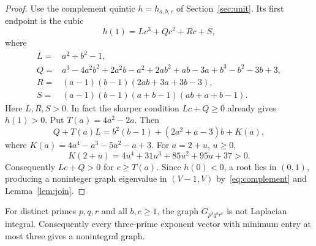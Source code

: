\begin{proof}
Use the complement quintic $h=h_{a,b,c}$ of Section~\ref{sec:unit}.
Its first endpoint is the cubic
\begin{equation}
\label{eq:general-first-endpoint}
h(1)=Lc^3+Qc^2+Rc+S,
\end{equation}
where
\begin{align*}
L={}&a^2+b^2-1,\\
Q={}&a^3-4a^2b^2+2a^2b-a^2+2ab^2+ab-3a
       +b^3-b^2-3b+3,\\
R={}&(a-1)(b-1)(2ab+3a+3b-3),\\
S={}&(a-1)(b-1)(a+b-1)(ab+a+b-1).
\end{align*}
Here $L,R,S>0$. In fact the sharper condition $Lc+Q\geq0$
already gives $h(1)>0$. Put $T(a)=4a^2-2a$. Then
\[
Q+T(a)L=b^2(b-1)+(2a^2+a-3)b+K(a),
\]
where $K(a)=4a^4-a^3-5a^2-a+3$. For $a=2+u$, $u\geq0$,
\[
K(2+u)=4u^4+31u^3+85u^2+95u+37>0.
\]
Consequently $Lc+Q>0$ for $c\geq T(a)$. Since $h(0)<0$,
a root lies in $(0,1)$, producing a noninteger graph eigenvalue in
$(V-1,V)$ by~\eqref{eq:complement} and Lemma~\ref{lem:join}.
\end{proof}

\begin{theorem}
\label{thm:minimum-three}
For distinct primes $p,q,r$ and all $b,c\geq1$, the graph
$G_{p^3q^br^c}$ is not Laplacian integral. Consequently every
three-prime exponent vector with minimum entry at most three gives a
nonintegral graph.
\end{theorem}

